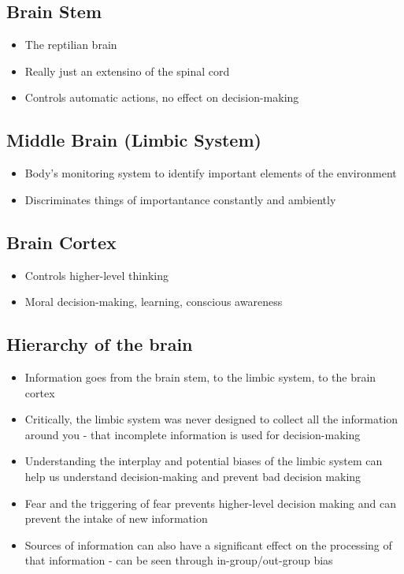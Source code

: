 \documentclass[11pt]{article}
\begin{document}
\subsection{Brain Stem}
\label{sec:orgc3a0df3}
\begin{itemize}
\item The reptilian brain
\item Really just an extensino of the spinal cord
\item Controls automatic actions, no effect on decision-making
\end{itemize}
\subsection{Middle Brain (Limbic System)}
\label{sec:orgad382e0}
\begin{itemize}
\item Body's monitoring system to identify important elements of the environment
\item Discriminates things of importantance constantly and ambiently
\end{itemize}
\subsection{Brain Cortex}
\label{sec:org9502c40}
\begin{itemize}
\item Controls higher-level thinking
\item Moral decision-making, learning, conscious awareness
\end{itemize}
\subsection{Hierarchy of the brain}
\label{sec:org26d99bb}
\begin{itemize}
\item Information goes from the brain stem, to the limbic system, to the brain cortex
\item Critically, the limbic system was never designed to collect all the information around you - that incomplete information is used for decision-making
\item Understanding the interplay and potential biases of the limbic system can help us understand decision-making and prevent bad decision making
\item Fear and the triggering of fear prevents higher-level decision making and can prevent the intake of new information
\item Sources of information can also have a significant effect on the processing of that information - can be seen through in-group/out-group bias
\end{itemize}
\end{document}
